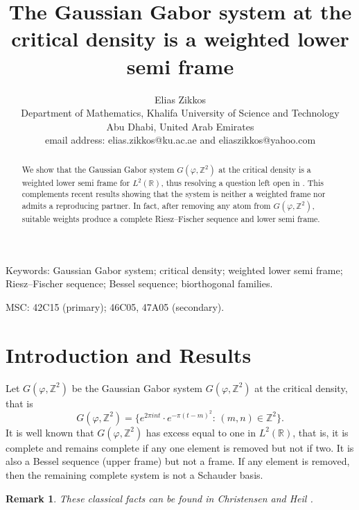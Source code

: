 \documentclass[11pt, a4paper]{article}
\newtheorem{remark}{Remark}[section]
\begin{document}
\title{The Gaussian Gabor system at the critical density is a weighted lower semi frame}
\author{Elias Zikkos\\
Department of Mathematics, Khalifa University of Science and Technology\\ Abu Dhabi, United Arab Emirates\\
email address:  elias.zikkos@ku.ac.ae and eliaszikkos@yahoo.com}



\maketitle


\begin{abstract}
We show that the Gaussian Gabor system $G(\varphi, \mathbb{Z}^2)$ at the critical density is a weighted lower semi frame for $L^2 (\mathbb{R})$, thus resolving a question left open in \cite{Balazs2026JFAA}. This complements recent results showing that the system is neither a weighted frame nor admits a reproducing partner. 
In fact, after removing any atom from $G(\varphi, \mathbb{Z}^2)$, suitable weights produce a complete Riesz–Fischer sequence and lower semi frame.
\end{abstract}

Keywords: 
Gaussian Gabor system; critical density; weighted lower semi frame;
Riesz--Fischer sequence; Bessel sequence; biorthogonal families.

 MSC: 42C15 (primary); 46C05, 47A05 (secondary).

\section{Introduction and Results}
\setcounter{equation}{0}

Let $G(\varphi, \mathbb{Z}^2)$ be the Gaussian Gabor system $G(\varphi, \mathbb{Z}^2)$ at the critical density, that is
\[
G(\varphi, \mathbb{Z}^2)=\{e^{2\pi int}\cdot e^{-\pi(t-m)^2}:\, (m,n)\in \mathbb{Z}^2\}.
\]
It is well known that $G(\varphi, \mathbb{Z}^2)$ has excess equal to one in $L^2 (\mathbb{R})$, that is,
it is complete and remains complete if any one element is removed but not if two.
It is also a Bessel sequence (upper frame) but not a frame. If any element is removed, then the remaining complete system is not a Schauder basis.
\begin{remark}
These classical facts can be found in Christensen \cite[Corollary 11.4.3 and Theorem 11.6.1]{Christensen}  
and Heil \cite[Example 11.34]{Heil}.
\end{remark}
\end{document}
